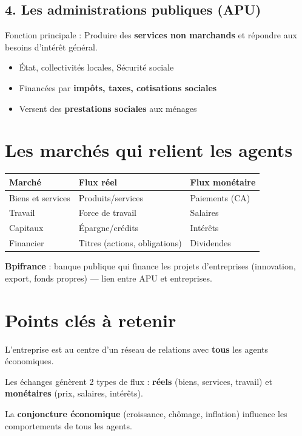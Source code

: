 \documentclass[11pt,a4paper]{article}
\begin{document}
\subsection*{4. Les administrations publiques (APU)}
\begin{keybox}
Fonction principale : Produire des \textbf{services non marchands} et répondre aux besoins d'intérêt général.
\end{keybox}
\begin{itemize}
  \item État, collectivités locales, Sécurité sociale
  \item Financées par \textbf{impôts, taxes, cotisations sociales}
  \item Versent des \textbf{prestations sociales} aux ménages
\end{itemize}

\section*{Les marchés qui relient les agents}

\begin{center}
\begin{tabular}{|l|l|l|}
\hline
\textbf{Marché} & \textbf{Flux réel} & \textbf{Flux monétaire} \\
\hline
Biens et services & Produits/services & Paiements (CA) \\
Travail & Force de travail & Salaires \\
Capitaux & Épargne/crédits & Intérêts \\
Financier & Titres (actions, obligations) & Dividendes \\
\hline
\end{tabular}
\end{center}

\vspace{4pt}
\begin{exbox}
\textbf{Bpifrance} : banque publique qui finance les projets d'entreprises (innovation, export, fonds propres) — lien entre APU et entreprises.
\end{exbox}

\section*{Points clés à retenir}

\begin{keybox}
L'entreprise est au centre d'un réseau de relations avec \textbf{tous} les agents économiques.
\end{keybox}
\vspace{3pt}
\begin{keybox}
Les échanges génèrent 2 types de flux : \textbf{réels} (biens, services, travail) et \textbf{monétaires} (prix, salaires, intérêts).
\end{keybox}
\vspace{3pt}
\begin{keybox}
La \textbf{conjoncture économique} (croissance, chômage, inflation) influence les comportements de tous les agents.
\end{keybox}
\end{document}
